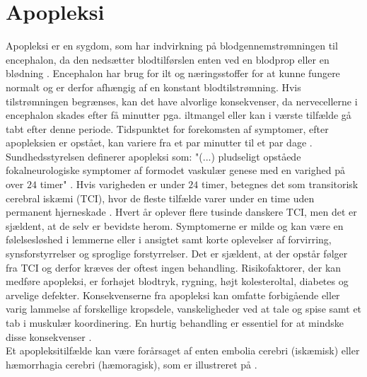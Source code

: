 \section{Apopleksi}
Apopleksi er en sygdom, som har indvirkning på blodgennemstrømningen til encephalon, da den nedsætter blodtilførslen enten ved en blodprop eller en blødning \cite{Hjernesagen2015a}. Encephalon har brug for ilt og næringsstoffer for at kunne fungere normalt og er derfor afhængig af en konstant blodtilstrømning. Hvis tilstrømningen begrænses, kan det have alvorlige konsekvenser, da nervecellerne i encephalon skades efter få minutter pga. iltmangel eller kan i værste tilfælde gå tabt efter denne periode. \cite{Hjernesagen2015a,Schulze2011,Giraldo2015} Tidspunktet for forekomsten af symptomer, efter apopleksien er opstået, kan variere fra et par minutter til et par dage \cite{Kruuse2014,Academic2015}. Sundhedsstyrelsen definerer apopleksi som: "(...) pludseligt opståede fokalneurologiske symptomer af formodet vaskulær genese med en varighed på over $24$ timer" \cite{Sundhedsstyrelsen2009}. Hvis varigheden er under $24$ timer, betegnes det som transitorisk cerebral iskæmi (TCI), hvor de fleste tilfælde varer under en time uden permanent hjerneskade \cite{Sundhed.dk2014, Ritter2015}. Hvert år oplever flere tusinde danskere TCI, men det er sjældent, at de selv er bevidste herom. Symptomerne er milde og kan være en følelsesløshed i lemmerne eller i ansigtet samt korte oplevelser af forvirring, synsforstyrrelser og sproglige forstyrrelser. Det er sjældent, at der opstår følger fra TCI og derfor kræves der oftest ingen behandling. \cite{Hjernesagen2015a,Academic2015} 
Risikofaktorer, der kan medføre apopleksi, er forhøjet blodtryk, rygning, højt kolesteroltal, diabetes og arvelige defekter. Konsekvenserne fra apopleksi kan omfatte forbigående eller varig lammelse af forskellige kropsdele, %
vanskeligheder ved at tale og spise samt et tab i muskulær koordinering. \cite{Academic2015} En hurtig behandling er essentiel for at mindske disse konsekvenser \cite{Hjernesagen2015a}. \\ %
Et apopleksitilfælde kan være forårsaget af enten embolia cerebri (iskæmisk) eller hæmorrhagia cerebri (hæmoragisk), som er illustreret på . \cite{Ritter2015} 

